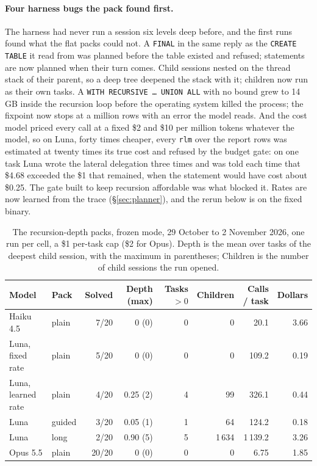 \documentclass[11pt,a4paper]{article}
\newcommand{\code}[1]{\texttt{#1}}
\begin{document}
\paragraph{Four harness bugs the pack found first.} The harness had never
run a session six levels deep before, and the first runs found what the
flat packs could not. A \code{FINAL} in the same reply as the \code{CREATE
TABLE} it read from was planned before the table existed and refused;
statements are now planned when their turn comes. Child sessions nested on
the thread stack of their parent, so a deep tree deepened the stack with
it; children now run as their own tasks. A \code{WITH RECURSIVE \ldots{}
UNION ALL} with no bound grew to 14 GB inside the recursion loop before the
operating system killed the process; the fixpoint now stops at a million
rows with an error the model reads. And the cost model priced every call at
a fixed \$2 and \$10 per million tokens whatever the model, so on Luna,
forty times cheaper, every \code{rlm} over the report rows was estimated at
twenty times its true cost and refused by the budget gate: on one task Luna
wrote the lateral delegation three times and was told each time that
\$4.68 exceeded the \$1 that remained, when the statement would have cost
about \$0.25. The gate built to keep recursion affordable was what blocked
it. Rates are now learned from the trace (\S\ref{sec:planner}), and the
rerun below is on the fixed binary.

\begin{table}[htbp]
\centering
\small
\begin{tabular}{@{}llrrrrrr@{}}
\toprule
Model & Pack & Solved & Depth (max) & Tasks $>0$ & Children & Calls / task & Dollars \\
\midrule
Haiku 4.5     & plain            & 7/20  & 0 (0)    & 0 & 0      & 20.1    & 3.66 \\
Luna, fixed rate & plain         & 5/20  & 0 (0)    & 0 & 0      & 109.2   & 0.19 \\
Luna, learned rate & plain       & 4/20  & 0.25 (2) & 4 & 99     & 326.1   & 0.44 \\
Luna          & guided           & 3/20  & 0.05 (1) & 1 & 64     & 124.2   & 0.18 \\
Luna          & long             & 2/20  & 0.90 (5) & 5 & 1\,634 & 1\,139.2 & 3.26 \\
Opus 5.5      & plain            & 20/20 & 0 (0)    & 0 & 0      & 6.75    & 1.85 \\
\bottomrule
\end{tabular}
\caption{The recursion-depth packs, frozen mode, 29 October to 2 November
2026, one run per cell, a \$1 per-task cap (\$2 for Opus). Depth is the
mean over tasks of the deepest child session, with the maximum in
parentheses; Children is the number of child sessions the run opened.}
\label{tab:recursion}
\end{table}
\end{document}

